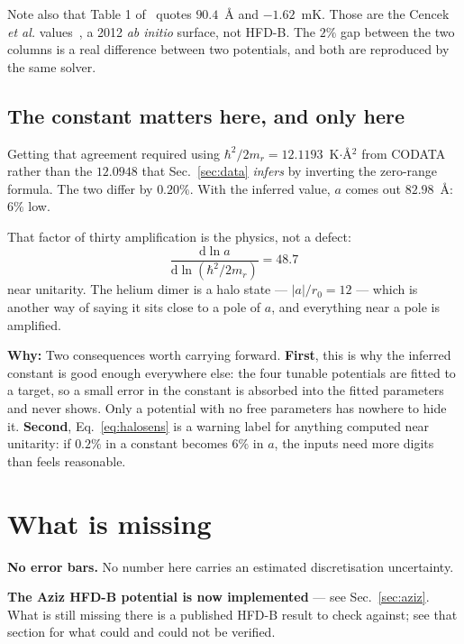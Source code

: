 \documentclass[11pt,a4paper]{article}
\newcommand{\why}[1]{\medskip\noindent\textbf{Why:} #1\medskip}
\begin{document}
Note also that Table 1 of~\cite{rbef} quotes $90.4$~\AA{} and $-1.62$~mK. Those
are the Cencek \emph{et al.} values~\cite{cencek}, a 2012 \emph{ab initio}
surface, not HFD-B. The $2\%$ gap between the two columns is a real difference
between two potentials, and both are reproduced by the same solver.

\subsection*{The constant matters here, and only here}
\label{sec:halo}

Getting that agreement required using $\hbar^2/2m_r = 12.1193$~K$\cdot$\AA$^2$
from CODATA rather than the $12.0948$ that Sec.~\ref{sec:data} \emph{infers} by
inverting the zero-range formula. The two differ by $0.20\%$. With the inferred
value, $a$ comes out $82.98$~\AA: $6\%$ low.

That factor of thirty amplification is the physics, not a defect:
\begin{equation}
  \frac{\mathrm{d}\ln a}{\mathrm{d}\ln (\hbar^2/2m_r)} = 48.7
  \label{eq:halosens}
\end{equation}
near unitarity. The helium dimer is a halo state --- $|a|/r_0 = 12$ --- which is
another way of saying it sits close to a pole of $a$, and everything near a pole
is amplified.

\why{Two consequences worth carrying forward. \textbf{First}, this is why the
inferred constant is good enough everywhere else: the four tunable potentials
are fitted to a target, so a small error in the constant is absorbed into the
fitted parameters and never shows. Only a potential with no free parameters has
nowhere to hide it. \textbf{Second}, Eq.~\eqref{eq:halosens} is a warning
label for anything computed near unitarity: if $0.2\%$ in a constant becomes
$6\%$ in $a$, the inputs need more digits than feels reasonable.}

\section{What is missing}

\textbf{No error bars.} No number here carries an estimated discretisation
uncertainty.

\textbf{The Aziz HFD-B potential is now implemented} --- see
Sec.~\ref{sec:aziz}. What is still missing there is a published HFD-B result to
check against; see that section for what could and could not be verified.
\end{document}
